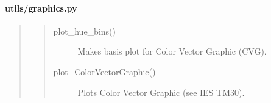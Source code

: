 \documentclass[letterpaper,10pt,english]{sphinxmanual}
\begin{document}
\paragraph{utils/graphics.py}
\label{\detokenize{color:utils-graphics-py}}\begin{quote}
\begin{quote}\begin{description}
\item[{plot\_hue\_bins()}] \leavevmode
Makes basis plot for Color Vector Graphic (CVG).

\item[{plot\_ColorVectorGraphic()}] \leavevmode
Plots Color Vector Graphic (see IES TM30).

\end{description}\end{quote}
\end{quote}
\end{document}
